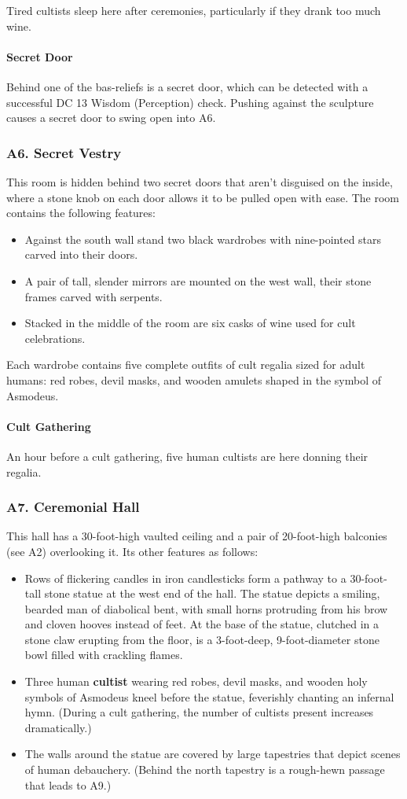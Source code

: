 \documentclass[10pt,a4paper,twoside,twocolumn,openany,nodeprecatedcode]{dndbook}
\begin{document}
Tired cultists sleep here after ceremonies, particularly if they drank too much wine.
\paragraph{Secret Door}
Behind one of the bas-reliefs is a secret door, which can be detected with a successful DC 13 Wisdom (Perception) check. Pushing against the sculpture causes a secret door to swing open into A6.
\subsubsection{A6. Secret Vestry}
This room is hidden behind two secret doors that aren't disguised on the inside, where a stone knob on each door allows it to be pulled open with ease. The room contains the following features:
\begin{itemize}

\item Against the south wall stand two black wardrobes with nine-pointed stars carved into their doors.
\item A pair of tall, slender mirrors are mounted on the west wall, their stone frames carved with serpents.
\item Stacked in the middle of the room are six casks of wine used for cult celebrations.
\end{itemize}


Each wardrobe contains five complete outfits of cult regalia sized for adult humans: red robes, devil masks, and wooden amulets shaped in the symbol of Asmodeus.
\paragraph{Cult Gathering}
An hour before a cult gathering, five human cultists are here donning their regalia.
\subsubsection{A7. Ceremonial Hall}
This hall has a 30-foot-high vaulted ceiling and a pair of 20-foot-high balconies (see A2) overlooking it. Its other features as follows:
\begin{itemize}

\item Rows of flickering candles in iron candlesticks form a pathway to a 30-foot-tall stone statue at the west end of the hall. The statue depicts a smiling, bearded man of diabolical bent, with small horns protruding from his brow and cloven hooves instead of feet. At the base of the statue, clutched in a stone claw erupting from the floor, is a 3-foot-deep, 9-foot-diameter stone bowl filled with crackling flames.
\item Three human \textbf{cultist} wearing red robes, devil masks, and wooden holy symbols of Asmodeus kneel before the statue, feverishly chanting an infernal hymn. (During a cult gathering, the number of cultists present increases dramatically.)
\item The walls around the statue are covered by large tapestries that depict scenes of human debauchery. (Behind the north tapestry is a rough-hewn passage that leads to A9.)
\end{itemize}
\end{document}
